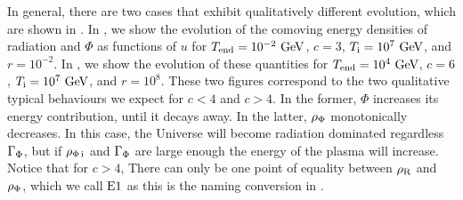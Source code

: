 \documentclass[11pt,a4paper]{article}
\begin{document}
In general, there are two cases that exhibit qualitatively different evolution, which are shown in . In , we show the evolution of the comoving energy densities of radiation and $\Phi$ as functions of $u$ for $T_{\rm end}{}=10^{-2}~{\rm GeV}$, $c=3$, $T_{\rm i}{}=10^7~{\rm GeV}$, and $r=10^{-2}$. In , we show the evolution of these quantities for $T_{\rm end}{}=10^{4}~{\rm GeV}$, $c=6$, $T_{\rm i}{}=10^7~{\rm GeV}$, and $r=10^{8}$. 
%
These two figures correspond to the two qualitative typical behaviours we expect for $c<4$ and $c>4$. In the former, $\Phi$ increases its energy contribution, until it decays away. In the latter,  $\rho_{\Phi}$ monotonically decreases. In this case, the Universe will become radiation dominated regardless $\Gamma_{\Phi}$, but if $\rho_{\Phi\,{\rm i}}$ and $\Gamma_{\Phi}$ are large enough the energy of the plasma will increase.  Notice that for $c>4$, There can only be one point of equality between $\rho_{\rm R}$ and $\rho_{\Phi}$, which we call ${\rm E1}{}$ as this is the naming conversion in \nsc.
%
\end{document}
